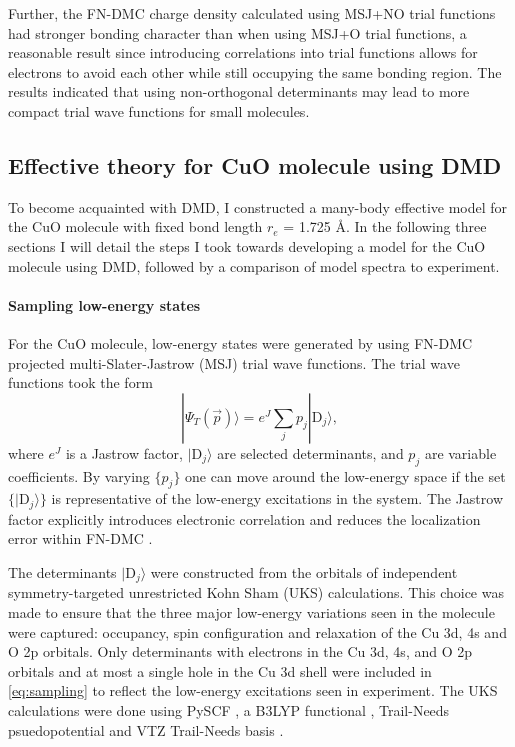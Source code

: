 \documentclass[12pt]{article}
\begin{document}
Further, the FN-DMC charge density calculated using MSJ+NO trial functions had stronger bonding character than when using MSJ+O trial functions, a reasonable result since introducing correlations into trial functions allows for electrons to avoid each other while still occupying the same bonding region. 
The results indicated that using non-orthogonal determinants may lead to more compact trial wave functions for small molecules.

\subsection{Effective theory for CuO molecule using DMD}
To become acquainted with DMD, I constructed a many-body effective model for the CuO molecule with fixed bond length $r_e$ = 1.725 \r{A}.
In the following three sections I will detail the steps I took towards developing a model for the CuO molecule using DMD, followed by a comparison of model spectra to experiment.

\vspace{-10pt}
\paragraph{Sampling low-energy states}
For the CuO molecule, low-energy states were generated by using FN-DMC projected multi-Slater-Jastrow (MSJ) trial wave functions.
The trial wave functions took the form
\begin{equation}
|\Psi_T(\vec{p}) \rangle =  e^{J}\sum_{j} p_j|\text{D}_j\rangle,
\label{eq:sampling}
\end{equation}
where $e^J$ is a Jastrow factor, $|\text{D}_j\rangle$ are selected determinants, and $p_j$ are variable coefficients.
By varying $\{p_j\}$ one can move around the low-energy space if the set $\{|\text{D}_j \rangle\}$ is representative of the low-energy excitations in the system.
The Jastrow factor explicitly introduces electronic correlation and reduces the localization error within FN-DMC \cite{Foulkes2001}.

The determinants $|\text{D}_j \rangle$ were constructed from the orbitals of independent symmetry-targeted unrestricted Kohn Sham (UKS) calculations.
This choice was made to ensure that the three major low-energy variations seen in the molecule were captured: occupancy, spin configuration and relaxation of the Cu 3d, 4s and O 2p orbitals.
Only determinants with electrons in the Cu 3d, 4s, and O 2p orbitals and at most a single hole in the Cu 3d shell were included in \eqref{eq:sampling} to reflect the low-energy excitations seen in experiment.
The UKS calculations were done using PySCF \cite{Sun2018}, a B3LYP functional \cite{doi:10.1063/1.464304, PhysRevB.37.785}, Trail-Needs psuedopotential and VTZ Trail-Needs basis \cite{doi:10.1063/1.4811651}.
\end{document}
